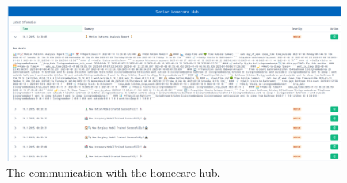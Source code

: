 \documentclass[A4,10pt]{article}
\begin{document}

\begin{figure}[H]
	\centering
	\includegraphics[width=1.1\textwidth]{homecare-hub01.png}
	\caption{The communication with the homecare-hub.}
	\label{fig:hub}
\end{figure}
\end{document}

